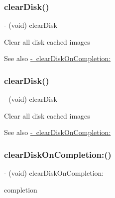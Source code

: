 \subsubsection{\texorpdfstring{clear\+Disk()}{clearDisk()}\hspace{0.1cm}{\footnotesize\ttfamily [2/3]}}
{\footnotesize\ttfamily -\/ (void) clear\+Disk \begin{DoxyParamCaption}{ }\end{DoxyParamCaption}}

Clear all disk cached images \begin{DoxySeeAlso}{See also}
\mbox{\hyperlink{interface_s_d_image_cache_ab936a83a1b711209d30f9051cc3658cc}{-\/ clear\+Disk\+On\+Completion\+:}} 
\end{DoxySeeAlso}
\mbox{\label{interface_s_d_image_cache_a2a9bcc872d749959df5dd458247b3301}} 
\subsubsection{\texorpdfstring{clear\+Disk()}{clearDisk()}\hspace{0.1cm}{\footnotesize\ttfamily [3/3]}}
{\footnotesize\ttfamily -\/ (void) clear\+Disk \begin{DoxyParamCaption}{ }\end{DoxyParamCaption}}

Clear all disk cached images \begin{DoxySeeAlso}{See also}
\mbox{\hyperlink{interface_s_d_image_cache_ab936a83a1b711209d30f9051cc3658cc}{-\/ clear\+Disk\+On\+Completion\+:}} 
\end{DoxySeeAlso}
\mbox{\label{interface_s_d_image_cache_ab936a83a1b711209d30f9051cc3658cc}} 
\subsubsection{\texorpdfstring{clear\+Disk\+On\+Completion\+:()}{clearDiskOnCompletion:()}\hspace{0.1cm}{\footnotesize\ttfamily [1/3]}}
{\footnotesize\ttfamily -\/ (void) clear\+Disk\+On\+Completion\+: \begin{DoxyParamCaption}\item[{(S\+D\+Web\+Image\+No\+Params\+Block)}]{completion }\end{DoxyParamCaption}}

